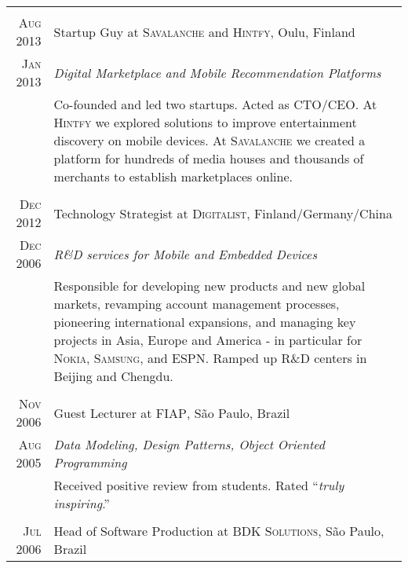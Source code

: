 \documentclass[a4paper,10pt]{article}
\begin{document}
\begin{tabular}{r|p{14cm}}
  \multicolumn{2}{c}{}\\

  \textsc{Aug 2013} & Startup Guy at \textsc{Savalanche} and \textsc{Hintfy}, Oulu, Finland \\

  \textsc{Jan 2013} & \emph{Digital Marketplace and Mobile Recommendation Platforms} \\

  &\footnotesize{Co-founded and led two startups. Acted as \textsc{CTO/CEO}. At
    \textsc{Hintfy} we explored solutions to improve entertainment discovery on
    mobile devices. At \textsc{Savalanche} we created a platform for hundreds of
    media houses and thousands of merchants to establish marketplaces online.}\\

  \multicolumn{2}{c}{}\\

  \textsc{Dec 2012} & Technology Strategist at \textsc{Digitalist},
  Finland/Germany/China \\

  \textsc{Dec 2006} & \emph{R\&D services for Mobile and Embedded Devices} \\

  &\footnotesize{Responsible for developing new products and new global markets,
    revamping account management processes, pioneering international expansions,
    and managing key projects in Asia, Europe and America - in particular for
    \textsc{Nokia}, \textsc{Samsung}, and \textsc{ESPN}. Ramped up R\&D centers
    in Beijing and Chengdu.}\\

  \multicolumn{2}{c}{}\\

  \textsc{Nov 2006} & Guest Lecturer at \textsc{FIAP}, S\~{a}o Paulo, Brazil \\

  \textsc{Aug 2005} & \emph{Data Modeling, Design Patterns, Object Oriented
    Programming} \\

  &\footnotesize{Received positive review from students. Rated ``\emph{truly
      inspiring}.''}\\

  \multicolumn{2}{c}{}\\

  \textsc{Jul 2006} & Head of Software Production at \textsc{BDK Solutions},
  S\~{a}o Paulo, Brazil \\


\end{tabular}
\end{document}
